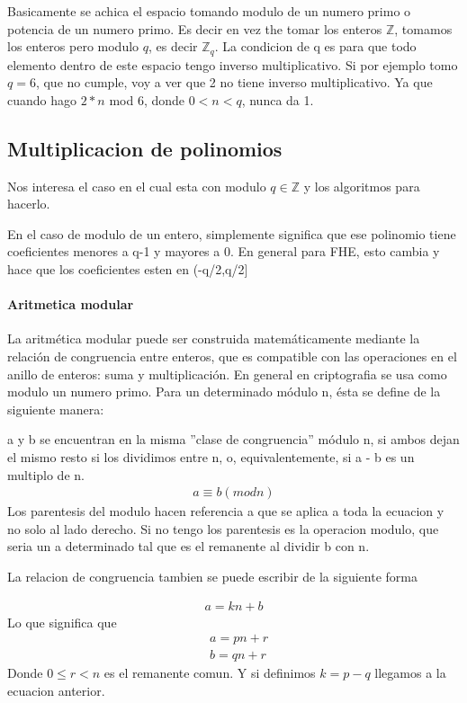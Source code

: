 \documentclass[12pt, oneside]{article}
\newcommand{\Z}{\mathbb{Z}}
\begin{document}
Basicamente se achica el espacio tomando modulo de un numero primo o potencia de un
numero primo.
Es decir en vez the tomar los enteros $\Z$, tomamos los enteros pero modulo $q$,
es decir $\Z_q$.
La condicion de q es para que todo elemento dentro de este espacio tengo inverso multiplicativo.
Si por ejemplo tomo $q=6$, que no cumple, voy a ver que 2 no tiene inverso multiplicativo.
Ya que cuando hago $2*n$ mod 6, donde $0 < n < q$, nunca da 1.

\subsection{Multiplicacion de polinomios}
Nos interesa el caso en el cual esta con modulo $q \in \Z$ y los algoritmos para hacerlo.

En el caso de modulo de un entero, simplemente significa que ese polinomio tiene coeficientes
menores a q-1 y mayores a 0.
En general para FHE, esto cambia y hace que los coeficientes esten en (-q/2,q/2]

\paragraph{Aritmetica modular}
La aritmética modular puede ser construida matemáticamente mediante la relación de
congruencia entre enteros, que es compatible con las operaciones en el anillo de enteros:
suma y multiplicación.
En general en criptografia se usa como modulo un numero primo.
Para un determinado módulo n, ésta se define de la siguiente manera:

a y b se encuentran en la misma ''clase de congruencia'' módulo n, si ambos dejan
el mismo resto si los dividimos entre n, o, equivalentemente, si a - b es un multiplo de n.
\begin{align*}
a\equiv b (mod n)
\end{align*}
Los parentesis del modulo hacen referencia a que se aplica a toda la ecuacion y no
solo al lado derecho.
Si no tengo los parentesis es la operacion modulo, que seria un a determinado tal que
es el remanente al dividir b con n.

La relacion de congruencia tambien se puede escribir de la siguiente forma

\begin{align*}
  a = kn + b
\end{align*}
Lo que significa que
\begin{align*}
  &a = pn + r \\
  &b = qn + r
\end{align*}
Donde $0\leq r <n$ es el remanente comun.
Y si definimos $k=p-q$ llegamos a la ecuacion anterior.
\end{document}
